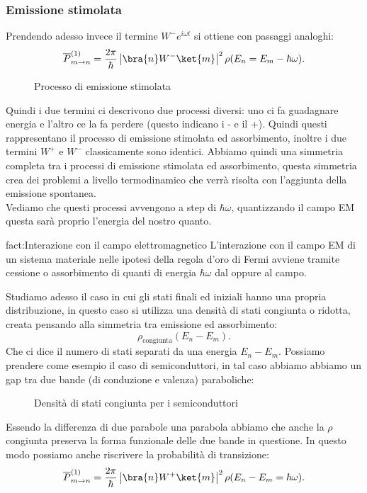 \subsubsection{Emissione stimolata}%
Prendendo adesso invece il termine $W^-e^{i\omega t}$ si ottiene con passaggi analoghi:
\[
    \overline{P}^{(1)}_{m\to n} = \frac{2\pi}{\hbar }\left|\bra{n}W^- \ket{m}\right|^2\rho(E_n=E_m-\hbar \omega) 
.\] 
\begin{figure}[H]
    \centering
    \caption{Processo di emissione stimolata}
    \label{fig:processo-di-emissione}
\end{figure}
\noindent
Quindi i due termini ci descrivono due processi diversi: uno ci fa guadagnare energia e l'altro ce la fa perdere (questo indicano i - e il +). Quindi questi rappresentano il processo di emissione stimolata ed assorbimento, inoltre i due termini $W^+$ e $W^-$ classicamente sono identici. Abbiamo quindi una simmetria completa tra i processi di emissione stimolata ed assorbimento, questa simmetria crea dei problemi a livello termodinamico che verrà risolta con l'aggiunta della emissione spontanea.\\
Vediamo che questi processi avvengono a step di $\hbar \omega$, quantizzando il campo EM questa sarà proprio l'energia del nostro quanto.
\begin{fact}{fact:Interazione con il campo elettromagnetico}
L'interazione con il campo EM di un sistema materiale nelle ipotesi della regola d'oro di Fermi avviene tramite cessione o assorbimento di quanti di energia $\hbar \omega$ dal oppure al campo.
\end{fact}
Studiamo adesso il caso in cui gli stati finali ed iniziali hanno una propria distribuzione, in questo caso si utilizza una densità di stati congiunta o ridotta, creata pensando alla simmetria tra emissione ed assorbimento:
\[
    \rho_\text{congiunta} (E_n-E_m) 
.\] 
Che ci dice il numero di stati separati da una energia $E_n-E_m$. Possiamo prendere come esempio il caso di semiconduttori, in tal caso abbiamo abbiamo un gap tra due bande (di conduzione e valenza) paraboliche:
\begin{figure}[H]
    \centering
    \caption{Densità di stati congiunta per i semiconduttori}
    \label{fig:densità-di-stati-congiunta-per-i-semiconduttori}
\end{figure}
\noindent
Essendo la differenza di due parabole una parabola abbiamo che anche la $\rho$ congiunta preserva la forma funzionale delle due bande in questione.
In questo modo possiamo anche riscrivere la probabilità di transizione:
\[
    \overline{P}^{(1)}_{m\to n} = \frac{2\pi}{\hbar }\left|\bra{n}W^+ \ket{m}\right|^2\rho(E_n-E_m=\hbar \omega) 
.\] 
